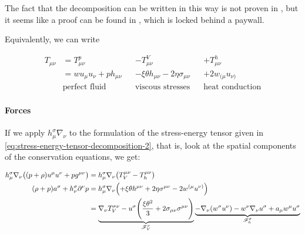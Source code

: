 \documentclass[main.tex]{subfiles}
\begin{document}
\begin{greenbox}
    The fact that the decomposition can be written in this way is not proven in \cite[]{Taub:1978}, but it seems like a proof can be found in \cite[]{Eckart:1940}, which is locked behind a paywall.
\end{greenbox}

Equivalently, we can write

\begin{subequations} \label{eq:stress-energy-tensor-decomposition-2}
\begin{align}
  T_{\mu\nu} &= T_{\mu\nu}^p && - T_{\mu\nu}^V &&+ T_{\mu\nu}^h  \\
  &= w u_\mu u_\nu + p h_{\mu\nu} &&-\xi \theta h_{\mu\nu} - 2 \eta \sigma_{\mu\nu} &&+2w_{(\mu} u_{\nu)}  \\
  &\text{perfect fluid} && \text{viscous stresses} && \text{heat conduction} \nonumber
\end{align}
\end{subequations}

\paragraph{Forces}

If we apply \(h^\sigma_\mu \nabla_\nu\) to the formulation of the stress-energy tensor given in \eqref{eq:stress-energy-tensor-decomposition-2}, that is, look at the spatial components of the conservation equations, we get:

\begin{subequations}
\begin{align}
  h^\sigma_\mu \nabla_\nu \qty((p+\rho) u^\mu u^\nu + p g^{\mu\nu}) &=
  h^\sigma_\mu \nabla_\nu \qty(T^{\mu\nu}_V - T^{\mu\nu}_h)  \\
  (\rho + p) a^\sigma + h^\sigma_\nu \partial^\nu p &= h^\sigma_\mu \nabla_\nu \qty(
  +\xi \theta h^{\mu\nu} + 2 \eta \sigma^{\mu\nu} - 2w^{(\mu} u^{\nu)})  \\
  &= \underbrace{\nabla_\nu T^{\sigma\nu}_V - u^\sigma \qty(\frac{\xi \theta^2}{3} +2 \sigma_{\mu\nu} \sigma^{\mu\nu})}_{\substack{\mathscr F ^\sigma _V}}
  \underbrace{ - \nabla_\nu (w^\sigma u^\nu) - w^\nu \nabla_\nu u^\sigma + a_\mu w^\mu u^\sigma  }_{\substack{\mathscr F ^\sigma _h}} \label{eq:full-spatial-equations-of-motion}
\end{align}
\end{subequations}
\end{document}
